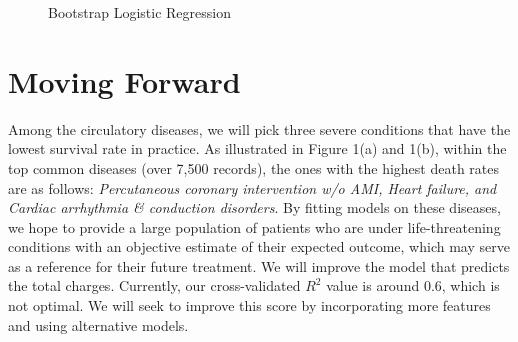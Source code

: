 \documentclass[12pt]{article}
\begin{document}
\begin{figure}[H]
 
  \hfill
  \caption{Bootstrap Logistic Regression}
\end{figure}


\section{Moving Forward}
Among the circulatory diseases, we will pick three severe conditions that have the lowest survival rate in practice. As illustrated in Figure 1(a) and 1(b), within the top common diseases (over 7,500 records), the ones with the highest death rates are as follows: \textit{Percutaneous coronary intervention w/o AMI, Heart failure, and Cardiac arrhythmia \& conduction disorders}. By fitting models on these diseases, we hope to provide a large population of patients who are under life-threatening conditions with an objective estimate of their expected outcome, which may serve as a reference for their future treatment.\bigskip
\newline We will improve the model that predicts the total charges. Currently, our cross-validated $R^2$ value is around 0.6, which is not optimal. We will seek to improve this score by incorporating more features and using alternative models.
\end{document}
